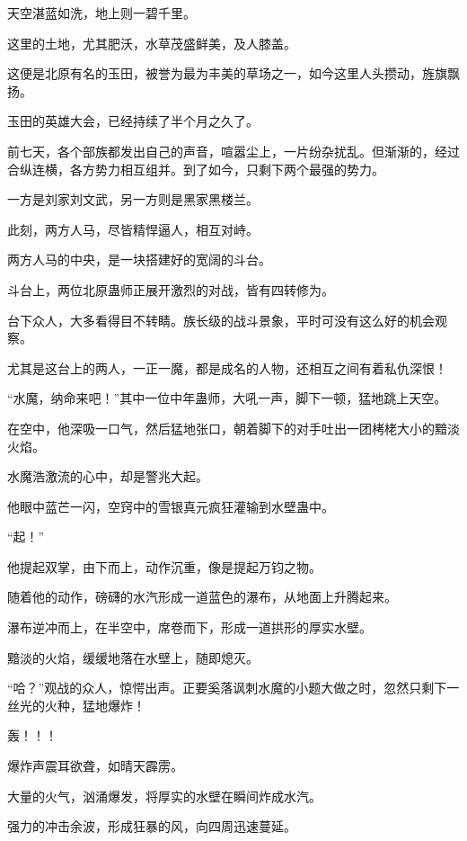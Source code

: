 
\begin{this_body}



天空湛蓝如洗，地上则一碧千里。

这里的土地，尤其肥沃，水草茂盛鲜美，及人膝盖。

这便是北原有名的玉田，被誉为最为丰美的草场之一，如今这里人头攒动，旌旗飘扬。

玉田的英雄大会，已经持续了半个月之久了。

前七天，各个部族都发出自己的声音，喧嚣尘上，一片纷杂扰乱。但渐渐的，经过合纵连横，各方势力相互组并。到了如今，只剩下两个最强的势力。

一方是刘家刘文武，另一方则是黑家黑楼兰。

此刻，两方人马，尽皆精悍逼人，相互对峙。

两方人马的中央，是一块搭建好的宽阔的斗台。

斗台上，两位北原蛊师正展开激烈的对战，皆有四转修为。

台下众人，大多看得目不转睛。族长级的战斗景象，平时可没有这么好的机会观察。

尤其是这台上的两人，一正一魔，都是成名的人物，还相互之间有着私仇深恨！

“水魔，纳命来吧！”其中一位中年蛊师，大吼一声，脚下一顿，猛地跳上天空。

在空中，他深吸一口气，然后猛地张口，朝着脚下的对手吐出一团栲栳大小的黯淡火焰。

水魔浩激流的心中，却是警兆大起。

他眼中蓝芒一闪，空窍中的雪银真元疯狂灌输到水壁蛊中。

“起！”

他提起双掌，由下而上，动作沉重，像是提起万钧之物。

随着他的动作，磅礴的水汽形成一道蓝色的瀑布，从地面上升腾起来。

瀑布逆冲而上，在半空中，席卷而下，形成一道拱形的厚实水壁。

黯淡的火焰，缓缓地落在水壁上，随即熄灭。

“哈？”观战的众人，惊愕出声。正要奚落讽刺水魔的小题大做之时，忽然只剩下一丝光的火种，猛地爆炸！

轰！！！

爆炸声震耳欲聋，如晴天霹雳。

大量的火气，汹涌爆发，将厚实的水壁在瞬间炸成水汽。

强力的冲击余波，形成狂暴的风，向四周迅速蔓延。


\end{this_body}
